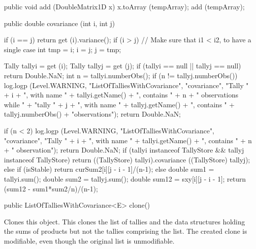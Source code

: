 \begin{htmlonly}
\end{htmlonly}
\begin{code}\begin{hide}

   public void add (DoubleMatrix1D x) {
      x.toArray (tempArray);
      add (tempArray);
   }

   public double covariance (int i, int j) {
      if (i == j)
         return get (i).variance();
      if (i > j) {
         // Make sure that i1 < i2, to have a single case
         int tmp = i;
         i = j;
         j = tmp;
      }

      Tally tallyi = get (i);
      Tally tallyj = get (j);
      if (tallyi == null || tallyj == null)
         return Double.NaN;
      int n = tallyi.numberObs();
      if (n != tallyj.numberObs()) {
         log.logp (Level.WARNING, "ListOfTalliesWithCovariance", "covariance",
            "Tally " + i  + ", with name " + tallyi.getName() + ", contains " 
            + n + " observations while " +
              "tally " + j + ", with name " + tallyj.getName() + ", contains " + tallyj.numberObs() + "observations");
         return Double.NaN;
      }

      if (n < 2) {
         log.logp (Level.WARNING, "ListOfTalliesWithCovariance", "covariance",
            "Tally " + i + ", with name " + tallyi.getName() + ", contains " + n + " observation");
         return Double.NaN;
      }
      if (tallyi instanceof TallyStore && tallyj instanceof TallyStore)
         return ((TallyStore) tallyi).covariance ((TallyStore) tallyj);
      else if (isStable)
         return curSum2[i][j - i - 1]/(n-1);
      else {
         double sum1 = tallyi.sum();
         double sum2 = tallyj.sum();
         double sum12 = sxy[i][j - i - 1];
         return (sum12 - sum1*sum2/n)/(n-1);
      }
   }\end{hide}

   public ListOfTalliesWithCovariance<E> clone()\begin{hide} {
      ListOfTalliesWithCovariance<E> ta = (ListOfTalliesWithCovariance<E>)super.clone();
      ta.tempArray = new double[size()];
      if (curAverages != null)
         ta.curAverages = curAverages.clone();
      if (sxy != null) {
         ta.sxy = new double[sxy.length][];
         for (int i = 0; i < sxy.length; i++)
            ta.sxy[i] = sxy[i].clone();
      }
      if (curSum2 != null) {
         ta.curSum2 = new double[curSum2.length][];
         for (int i = 0; i < curSum2.length; i++)
            ta.curSum2[i] = curSum2[i].clone();
      }
      return ta;
   }
}\end{hide}
\end{code}
\begin{tabb}   Clones this object.
   This clones the list of tallies and the data structures holding the sums of products but
   not the tallies comprising the list.
  The created clone is modifiable, even though the original list is unmodifiable.
\end{tabb}
